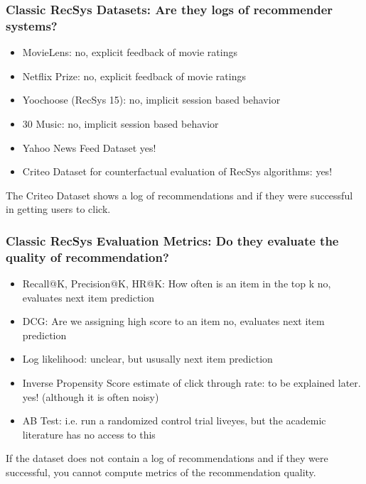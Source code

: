  \begin{frame}
  \frametitle{Classic RecSys Datasets: Are they logs of recommender systems?}

  \begin{itemize}
    \item MovieLens: \pause no, explicit feedback of movie ratings \pause
    \item Netflix Prize: \pause no, explicit feedback of movie ratings \pause
    \item Yoochoose (RecSys 15): \pause no, implicit session based behavior \pause
    \item 30 Music: \pause no, implicit session based behavior \pause
    \item Yahoo News Feed Dataset \pause yes!
    \item Criteo Dataset for counterfactual evaluation of RecSys algorithms: \pause yes!
  \end{itemize}

  \pause
  The Criteo Dataset shows a log of recommendations and if they were successful in getting users to click.  
\end{frame}



\begin{frame}
  \frametitle{Classic RecSys Evaluation Metrics: Do they evaluate the quality of recommendation?}

  \begin{itemize}
    \item Recall@K, Precision@K, HR@K:  \pause How often is an item in the top k \pause no, evaluates next item prediction \pause
    \item DCG:   \pause Are we assigning high score to an item \pause no, evaluates next item prediction \pause
    \item Log likelihood: \pause  unclear, but ususally next item prediction \pause
    \item Inverse Propensity Score estimate of click through rate: \pause to be explained later. \pause yes! (although it is often noisy) \pause
    \item AB Test: \pause i.e. run a randomized control trial live\pause yes, but the academic literature has no access to this 
  \end{itemize}

  \pause
If the dataset does not contain a log of recommendations and if they were successful, you cannot compute metrics of the recommendation quality.
\end{frame}



